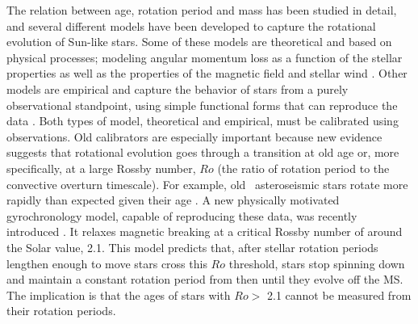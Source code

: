 The relation between age, rotation period and mass has been studied in detail,
and several different models have been developed to capture the rotational
evolution of Sun-like stars.
Some of these models are theoretical and based on physical processes; modeling
angular momentum loss as a function of the stellar properties as well as the
properties of the magnetic field and stellar wind \citep{kawaler1988,
kawaler1989, vansaders2013, matt2015, vansaders2016}.
Other models are empirical and capture the behavior of stars from a purely
observational standpoint, using simple functional forms that can reproduce the
data \citep{barnes2003, barnes2007, mamajek2008, angus2015}.
Both types of model, theoretical and empirical, must be calibrated using
observations.
Old calibrators are especially important because new evidence suggests that
rotational evolution goes through a transition at old age or, more
specifically, at a large Rossby number, $Ro$ (the ratio of rotation period to
the convective overturn timescale).
For example, old \kepler\ asteroseismic stars rotate more rapidly than
expected given their age \citep[\eg][]{angus2015, vansaders2016}.
A new physically motivated gyrochronology model, capable of reproducing these
data, was recently introduced \citep{vansaders2016}.
It relaxes magnetic breaking at a critical Rossby number of around the Solar
value, 2.1.
This model predicts that, after stellar rotation periods lengthen enough to
move stars cross this $Ro$ threshold, stars stop spinning down and maintain a
constant rotation period from then until they evolve off the MS.
The implication is that the ages of stars with $Ro >$ 2.1 cannot be measured
from their rotation periods.


